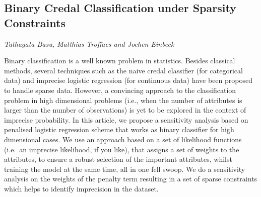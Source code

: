 \documentclass[../booklet.tex]{subfiles}
\begin{document}
\subsection[Binary Credal Classification under Sparsity Constraints. {\it Tathagata Basu, Matthias Troffaes and Jochen Einbeck}]{Binary Credal Classification under Sparsity Constraints}
  

\begin{center}
  {\it Tathagata Basu, Matthias Troffaes and Jochen Einbeck}
\end{center}



Binary classification is a well known problem in statistics. 
Besides classical methods, several techniques such as
the naive credal classifier (for categorical data) and imprecise logistic 
regression (for continuous data) have been proposed
to handle sparse data.
However, a convincing approach to the
classification problem in high dimensional problems (i.e., when the 
number of attributes is larger than the number of observations) is yet to
be explored in the context of imprecise probability. In this
article, we propose a sensitivity analysis based on penalised logistic regression
scheme that works as binary classifier for high dimensional cases.
We use an approach based on a set of likelihood functions (i.e.~an imprecise likelihood, 
if you like),  that assigns a set of weights to the attributes,
to ensure a robust selection of the important attributes,
whilst training the model at the same time, all in one fell swoop.
We do a sensitivity analysis on the weights of the penalty term resulting
in a set of sparse constraints which helps to identify imprecision in the dataset.

\end{document}
